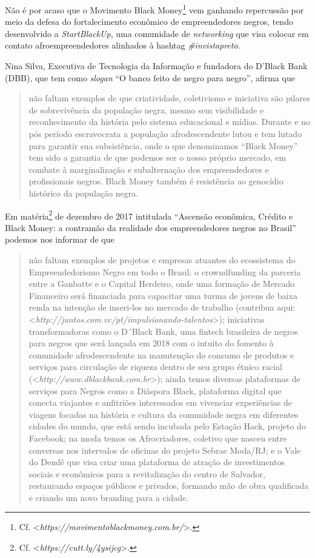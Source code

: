 Não é por acaso que o Movimento Black Money\footnote{Cf.
  \textless{}\emph{https://movimentoblackmoney.com.br/}\textgreater{}.} vem ganhando repercussão
por meio da defesa do fortalecimento econômico de empreendedores negros,
tendo desenvolvido a \emph{StartBlackUp}, uma comunidade de
\emph{networking} que visa colocar em contato afroempreendedores
alinhados à hashtag \emph{\#invistapreto}.

Nina Silva, Executiva de Tecnologia da Informação e fundadora do D'Black
Bank (DBB), que tem como \emph{slogan} ``O banco feito de negro para
negro'', afirma que

\begin{quote}
não faltam exemplos de que criatividade, coletivismo e iniciativa são
pilares de sobrevivência da população negra, mesmo sem visibilidade e
reconhecimento da história pelo sistema educacional e mídias. Durante e
no pós período escravocrata a população afrodescendente lutou e tem
lutado para garantir sua subsistência, onde o que denominamos ``Black
Money'' tem sido a garantia de que podemos ser o nosso próprio mercado,
em combate à marginalização e subalternação dos empreendedores e
profissionais negros. Black Money também é resistência ao genocídio
histórico da população negra.
\end{quote}

Em matéria\footnote{Cf.
  \textless{}\emph{https://cutt.ly/4ysijcg}\textgreater{}.}
de dezembro de 2017 intitulada ``Ascensão econômica, Crédito e Black
Money: a contramão da realidade dos empreendedores negros no Brasil''
podemos nos informar de que

\begin{quote}
não faltam exemplos de projetos e empresas atuantes do ecossistema do
Empreendedorismo Negro em todo o Brasil: o crowndfunding da parceria
entre a Ganbatte e o Capital Herdeiro, onde uma formação de Mercado
Financeiro será financiada para capacitar uma turma de jovens de baixa
renda na intenção de inseri-los no mercado de trabalho (contribua aqui:
\textless{}\emph{http://juntos.com.vc/pt/impulsionando-talentos}\textgreater{}); iniciativas
transformadoras como o D´Black Bank, uma fintech brasileira de negros
para negros que será lançada em 2018 com o intuito do fomento à
comunidade afrodescendente na manutenção do consumo de produtos e
serviços para circulação de riqueza dentro de seu grupo étnico racial
(\textless{}\emph{http://www.dblackbank.com.br}\textgreater{}); ainda temos diversas plataformas
de serviços para Negros como a Diáspora Black, plataforma digital que
conecta viajantes e anfitriões interessados em vivenciar experiências de
viagens focadas na história e cultura da comunidade negra em diferentes
cidades do mundo, que está sendo incubada pelo Estação Hack, projeto do
Facebook; na moda temos os Afrocriadores, coletivo que nasceu entre
conversas nos intervalos de oficinas do projeto Sebrae Moda/RJ; e o Vale
do Dendê que visa criar uma plataforma de atração de investimentos
sociais e econômicos para a revitalização do centro de Salvador,
restaurando espaços públicos e privados, formando mão de obra
qualificada e criando um novo branding para a cidade.
\end{quote}


